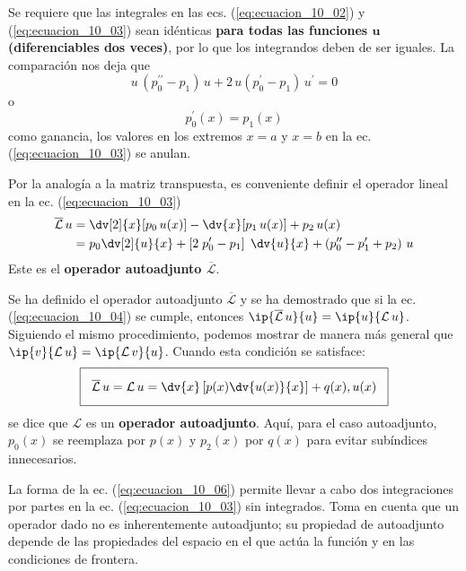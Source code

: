 Se requiere que las integrales en las ecs. (\ref{eq:ecuacion_10_02}) y (\ref{eq:ecuacion_10_03}) sean idénticas \textbf{para todas las funciones $\bm{u}$ (diferenciables dos veces)}, por lo que los integrandos deben de ser iguales. La comparación nos deja que
\[ u \, (p_{0}^{\prime \prime} - p_{1}) \, u + 2 \, u (p_{0}^{\prime} - p_{1}) \, u^{\prime} = 0 \]
o
\begin{equation}
p_{0}^{\prime} (x) = p_{1} (x)
\label{eq:ecuacion_10_04}
\end{equation}
como ganancia, los valores en los extremos $x=a$ y $x=b$ en la ec. (\ref{eq:ecuacion_10_03}) se anulan.
\par
Por la analogía a la matriz transpuesta, es conveniente definir el operador lineal en la ec. (\ref{eq:ecuacion_10_03})
\begin{align}
\begin{aligned}
\overline{\mathcal{L}} \, u &= \dv[2]{x} [ p_{0} \, u(x)] - \dv{x} [p_{1} \, u(x)] + p_{2} \, u(x) \\
&= p_{0} \dv[2]{u}{x} + \left[ 2 \; p_{0}^{\prime} - p_{1} \right] \; \dv{u}{x} + \left( p_{0}^{\prime \prime} - p_{1}^{\prime} + p_{2} \right) \, u
\label{eq:ecuacion_10_05}
\end{aligned}
\end{align}
Este es el \textbf{operador autoadjunto $\overline{\mathcal{L}}$}.
\par 
Se ha definido el operador autoadjunto $\overline{\mathcal{L}}$ y se ha demostrado que si la ec. (\ref{eq:ecuacion_10_04}) se cumple, entonces $\ip{\overline{\mathcal{L}} \, u}{u} = \ip{u}{\mathcal{L} \, u}$. Siguiendo el mismo procedimiento, podemos mostrar de manera más general que $\ip{v}{\mathcal{L} \, u} = \ip{\mathcal{L} \, v}{u}$. Cuando esta condición se satisface:
\begin{equation}
\setlength{\fboxsep}{3\fboxsep}\boxed{\overline{\mathcal{L}} \, u = \mathcal{L} \, u = \dv{x} \left[ p(x) \dv{u(x)}{x} \right] + q(x) , u(x)}
\label{eq:ecuacion_10_06}
\end{equation}
se dice que $\mathcal{L}$ es un \textbf{operador autoadjunto}. Aquí, para el caso autoadjunto, $p_{0}(x)$ se reemplaza por $p(x)$ y $p_{2}(x)$ por $q(x)$ para evitar subíndices innecesarios.
\par
La forma de la ec. (\ref{eq:ecuacion_10_06}) permite llevar a cabo dos integraciones por partes en la ec. (\ref{eq:ecuacion_10_03}) sin integrados. Toma en cuenta que un operador dado no es inherentemente autoadjunto; su propiedad de autoadjunto depende de las propiedades del espacio en el que actúa la función y en las condiciones de frontera.
